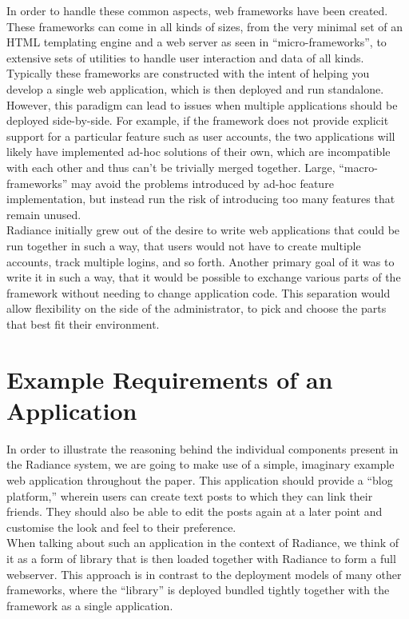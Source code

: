 \documentclass{sig-alternate}
\begin{document}
In order to handle these common aspects, web frameworks have been created. These frameworks can come in all kinds of sizes, from the very minimal set of an HTML templating engine and a web server as seen in ``micro-frameworks''\cite{microframeworks}, to extensive sets of utilities to handle user interaction and data of all kinds. \\

Typically these frameworks are constructed with the intent of helping you develop a single web application, which is then deployed and run standalone. However, this paradigm can lead to issues when multiple applications should be deployed side-by-side. For example, if the framework does not provide explicit support for a particular feature such as user accounts, the two applications will likely have implemented ad-hoc solutions of their own, which are incompatible with each other and thus can't be trivially merged together. Large, ``macro-frameworks'' may avoid the problems introduced by ad-hoc feature implementation, but instead run the risk of introducing too many features that remain unused. \\

Radiance initially grew out of the desire to write web applications that could be run together in such a way, that users would not have to create multiple accounts, track multiple logins, and so forth. Another primary goal of it was to write it in such a way, that it would be possible to exchange various parts of the framework without needing to change application code. This separation would allow flexibility on the side of the administrator, to pick and choose the parts that best fit their environment.

\section{Example Requirements of an Application}
In order to illustrate the reasoning behind the individual components present in the Radiance system, we are going to make use of a simple, imaginary example web application throughout the paper. This application should provide a ``blog platform,'' wherein users can create text posts to which they can link their friends. They should also be able to edit the posts again at a later point and customise the look and feel to their preference. \\

When talking about such an application in the context of Radiance, we think of it as a form of library that is then loaded together with Radiance to form a full webserver. This approach is in contrast to the deployment models of many other frameworks, where the ``library'' is deployed bundled tightly together with the framework as a single application. \\
\end{document}
